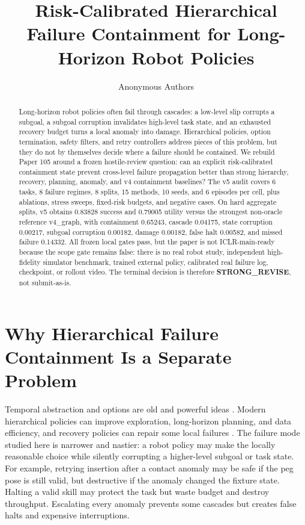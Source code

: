 \documentclass{article}
\title{Risk-Calibrated Hierarchical Failure Containment for Long-Horizon Robot Policies}
\author{Anonymous Authors}
\begin{document}
\maketitle

\begin{abstract}
Long-horizon robot policies often fail through cascades: a low-level slip corrupts a subgoal, a subgoal corruption invalidates high-level task state, and an exhausted recovery budget turns a local anomaly into damage. Hierarchical policies, option termination, safety filters, and retry controllers address pieces of this problem, but they do not by themselves decide where a failure should be contained. We rebuild Paper 105 around a frozen hostile-review question: can an explicit risk-calibrated containment state prevent cross-level failure propagation better than strong hierarchy, recovery, planning, anomaly, and v4 containment baselines? The v5 audit covers 6 tasks, 8 failure regimes, 8 splits, 15 methods, 10 seeds, and 6 episodes per cell, plus ablations, stress sweeps, fixed-risk budgets, and negative cases. On hard aggregate splits, v5 obtains 0.83828 success and 0.79005 utility versus the strongest non-oracle reference v4\_graph, with containment 0.65243, cascade 0.04175, state corruption 0.00217, subgoal corruption 0.00182, damage 0.00182, false halt 0.00582, and missed failure 0.14332. All frozen local gates pass, but the paper is not ICLR-main-ready because the scope gate remains false: there is no real robot study, independent high-fidelity simulator benchmark, trained external policy, calibrated real failure log, checkpoint, or rollout video. The terminal decision is therefore \textbf{STRONG\_REVISE}, not submit-as-is.
\end{abstract}

\section{Why Hierarchical Failure Containment Is a Separate Problem}
Temporal abstraction and options are old and powerful ideas \citep{sutton1999options,bacon2017option,nachum2018hiro,thananjeyan2020recovery,vats2024recoverychaining,lin2025failsafe}. Modern hierarchical policies can improve exploration, long-horizon planning, and data efficiency, and recovery policies can repair some local failures \citep{sutton1999options,bacon2017option,nachum2018hiro,thananjeyan2020recovery,vats2024recoverychaining,lin2025failsafe,huang2026hwm1,hedegaard2025beyond2,buamanee2026bihil3,hu2026recovla4,mao2024robomatrix5,shen2026metaworld6,park2025hierarchical7,lin2025failsafe8,ma2024hierarchical9,lane2002task10,wolfe2010combined11,schakkal2025hierarchical12}. The failure mode studied here is narrower and nastier: a robot policy may make the locally reasonable choice while silently corrupting a higher-level subgoal or task state. For example, retrying insertion after a contact anomaly may be safe if the peg pose is still valid, but destructive if the anomaly changed the fixture state. Halting a valid skill may protect the task but waste budget and destroy throughput. Escalating every anomaly prevents some cascades but creates false halts and expensive interruptions.
\end{document}
